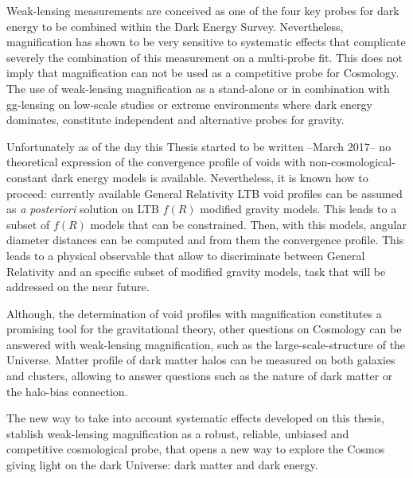 Weak-lensing measurements are conceived as one of the four key probes for dark energy to be combined within the Dark Energy Survey. Nevertheless, magnification has shown to be very sensitive to systematic effects that complicate severely the combination of this measurement on a multi-probe fit. This does not imply that magnification can not be used as a competitive probe for Cosmology. The use of weak-lensing magnification as a stand-alone or in combination with gg-lensing on low-scale studies or extreme environments where dark energy dominates, constitute independent and alternative probes for gravity.
\newline

Unfortunately as of the day this Thesis started to be written --March 2017-- no theoretical expression of the convergence profile of voids with non-cosmological-constant dark energy models is available. Nevertheless, it is known how to proceed: currently available General Relativity LTB void profiles can be assumed as {\it a posteriori} solution on LTB $f(R)$ modified gravity models. This leads to a subset of $f(R)$ models that can be constrained. Then, with this models, angular diameter distances can be computed and from them the convergence profile. This leads to a physical observable that allow to discriminate between General Relativity and an specific subset of modified gravity models, task that will be addressed on the near future.
\newline

Although, the determination of void profiles with magnification constitutes a promising tool for the gravitational theory, other questions on Cosmology can be answered with weak-lensing magnification, such as the large-scale-structure of the Universe. Matter profile of dark matter halos can be measured on both galaxies and clusters, allowing to answer questions such as the nature of dark matter or the halo-bias connection.
\newline

The new way to take into account systematic effects developed on this thesis, stablish weak-lensing magnification as a robust, reliable, unbiased and competitive cosmological probe, that opens a new way to explore the Cosmos giving light on the dark Universe: dark matter and  dark energy.